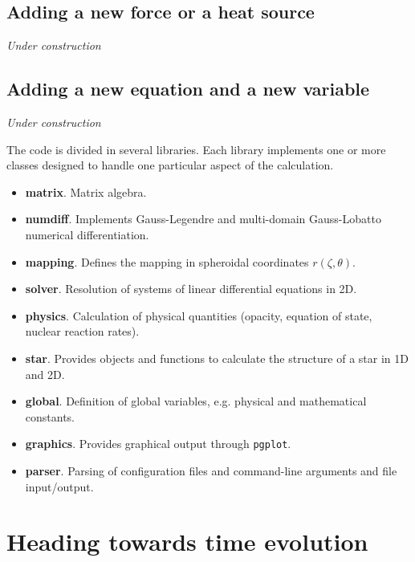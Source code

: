 \subsection{Adding a new force or a heat source}

{\it Under construction}

\subsection{Adding a new equation and a new variable}

{\it Under construction}

\bigskip
\bigskip
The code is divided in several libraries. Each library implements one or
more classes designed to handle one particular aspect of the calculation.

\begin{itemize}
\item {\bf matrix}. Matrix algebra.

\item {\bf numdiff}. Implements Gauss-Legendre and multi-domain
Gauss-Lobatto numerical differentiation.

\item {\bf mapping}. Defines the mapping in spheroidal coordinates
$r(\zeta,\theta)$.

\item {\bf solver}. Resolution of systems of linear differential equations
in 2D.

\item {\bf physics}. Calculation of physical quantities (opacity,
equation of state, nuclear reaction rates).

\item {\bf star}. Provides objects and functions to calculate the
structure of a star in 1D and 2D.

\item {\bf global}. Definition of global variables, e.g. physical and mathematical constants.

\item {\bf graphics}. Provides graphical output through {\tt pgplot}.
\item {\bf parser}. Parsing of configuration files and command-line
arguments and file input/output.

\end{itemize} 


\section{Heading towards time evolution}


